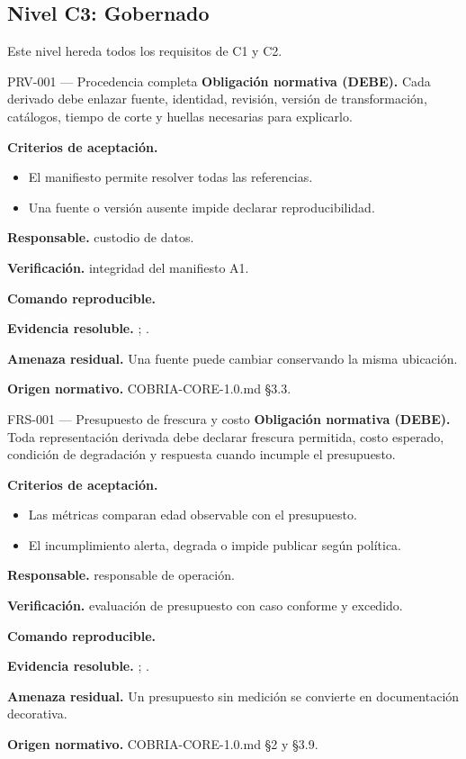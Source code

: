 \subsection{Nivel C3: Gobernado}
\label{nivel:c3}
Este nivel hereda todos los requisitos de C1 y C2.
\begin{requisito}{PRV-001 --- Procedencia completa}
\textbf{Obligación normativa (DEBE).} Cada derivado debe enlazar fuente, identidad, revisión, versión de transformación, catálogos, tiempo de corte y huellas necesarias para explicarlo.\par
\textbf{Criterios de aceptación.}
\begin{itemize}
\item El manifiesto permite resolver todas las referencias.
\item Una fuente o versión ausente impide declarar reproducibilidad.
\end{itemize}
\textbf{Responsable.} custodio de datos.\par
\textbf{Verificación.} integridad del manifiesto A1.\par
\textbf{Comando reproducible.} \texttt{}\par
\textbf{Evidencia resoluble.} ; .\par
\textbf{Amenaza residual.} Una fuente puede cambiar conservando la misma ubicación.\par
\textbf{Origen normativo.} COBRIA-CORE-1.0.md §3.3.
\end{requisito}
\begin{requisito}{FRS-001 --- Presupuesto de frescura y costo}
\textbf{Obligación normativa (DEBE).} Toda representación derivada debe declarar frescura permitida, costo esperado, condición de degradación y respuesta cuando incumple el presupuesto.\par
\textbf{Criterios de aceptación.}
\begin{itemize}
\item Las métricas comparan edad observable con el presupuesto.
\item El incumplimiento alerta, degrada o impide publicar según política.
\end{itemize}
\textbf{Responsable.} responsable de operación.\par
\textbf{Verificación.} evaluación de presupuesto con caso conforme y excedido.\par
\textbf{Comando reproducible.} \texttt{}\par
\textbf{Evidencia resoluble.} ; .\par
\textbf{Amenaza residual.} Un presupuesto sin medición se convierte en documentación decorativa.\par
\textbf{Origen normativo.} COBRIA-CORE-1.0.md §2 y §3.9.
\end{requisito}

